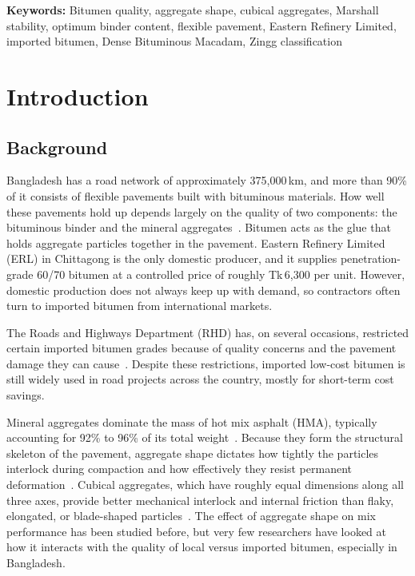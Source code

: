 \documentclass[12pt,a4paper]{article}
\begin{document}
\vspace{0.5cm}
\noindent\textbf{Keywords:} Bitumen quality, aggregate shape, cubical aggregates, Marshall stability, optimum binder content, flexible pavement, Eastern Refinery Limited, imported bitumen, Dense Bituminous Macadam, Zingg classification

\clearpage
{}
\setcounter{page}{1}
\section{Introduction}

\subsection{Background}

Bangladesh has a road network of approximately 375,000\,km, and more than 90\% of it consists of flexible pavements built with bituminous materials. How well these pavements hold up depends largely on the quality of two components: the bituminous binder and the mineral aggregates~\cite{werkineh2020assessment}. Bitumen acts as the glue that holds aggregate particles together in the pavement. Eastern Refinery Limited (ERL) in Chittagong is the only domestic producer, and it supplies penetration-grade 60/70 bitumen at a controlled price of roughly Tk\,6,300 per unit. However, domestic production does not always keep up with demand, so contractors often turn to imported bitumen from international markets.

The Roads and Highways Department (RHD) has, on several occasions, restricted certain imported bitumen grades because of quality concerns and the pavement damage they can cause~\cite{imran2025developing}. Despite these restrictions, imported low-cost bitumen is still widely used in road projects across the country, mostly for short-term cost savings.

Mineral aggregates dominate the mass of hot mix asphalt (HMA), typically accounting for 92\% to 96\% of its total weight~\cite{rajkumar2018experimental}. Because they form the structural skeleton of the pavement, aggregate shape dictates how tightly the particles interlock during compaction and how effectively they resist permanent deformation~\cite{teja2020effect}. Cubical aggregates, which have roughly equal dimensions along all three axes, provide better mechanical interlock and internal friction than flaky, elongated, or blade-shaped particles~\cite{sumanth2017study}. The effect of aggregate shape on mix performance has been studied before, but very few researchers have looked at how it interacts with the quality of local versus imported bitumen, especially in Bangladesh.
\end{document}
